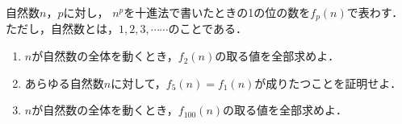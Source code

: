 \documentclass[../../main.tex]{subfiles}
\begin{document}
自然数$n$，$p$に対し，
$n^p$を十進法で書いたときの1の位の数を$f_p(n)$で表わす．
ただし，自然数とは，$1,2,3,\cdots\cdots$のことである．
\begin{enumerate}
  \item $n$が自然数の全体を動くとき，$f_2(n)$の取る値を全部求めよ．
  \item あらゆる自然数$n$に対して，$f_5(n)=f_1(n)$が成りたつことを証明せよ．
  \item $n$が自然数の全体を動くとき，$f_{100}(n)$の取る値を全部求めよ．
\end{enumerate}
\end{document}
